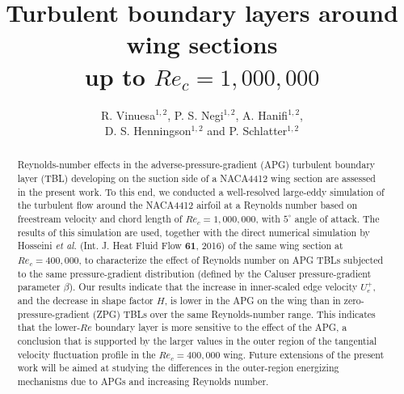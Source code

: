 \documentclass[preprint,12pt,authoryear]{elsarticle}
\begin{document}
\begin{frontmatter}



\title{Turbulent boundary layers around wing sections \\ up to $Re_{c}=1,000,000$}


\author{R. Vinuesa$^{1,2}$, P. S. Negi$^{1,2}$, A. Hanifi$^{1,2}$, \\ D. S. Henningson$^{1,2}$ and P. Schlatter$^{1,2}$}

\address{$^1$Linn\'e FLOW Centre, KTH Mechanics, SE-100 44 Stockholm, Sweden\\
$^2$Swedish e-Science Research Centre (SeRC), Stockholm, Sweden}

\begin{abstract}
Reynolds-number effects in the adverse-pressure-gradient (APG) turbulent boundary layer (TBL) developing on the suction side of a NACA4412 wing section are assessed in the present work. To this end, we conducted a well-resolved large-eddy simulation of the turbulent flow around the NACA4412 airfoil at a Reynolds number based on freestream velocity and chord length of $Re_{c}=1,000,000$, with $5^{\circ}$ angle of attack. The results of this simulation are used, together with the direct numerical simulation by Hosseini {\it et al.} (Int. J. Heat Fluid Flow {\bf 61}, 2016) of the same wing section at $Re_{c}=400,000$, to characterize the effect of Reynolds number on APG TBLs subjected to the same pressure-gradient distribution (defined by the Caluser pressure-gradient parameter $\beta$). Our results indicate that the increase in inner-scaled edge velocity $U^{+}_{e}$, and the decrease in shape factor $H$, is lower in the APG on the wing than in zero-pressure-gradient (ZPG) TBLs over the same Reynolds-number range. This indicates that the lower-$Re$ boundary layer is more sensitive to the effect of the APG, a conclusion that is supported by the larger values in the outer region of the tangential velocity fluctuation profile in the $Re_{c}=400,000$ wing. Future extensions of the present work will be aimed at studying the differences in the outer-region energizing mechanisms due to APGs and increasing Reynolds number.


\end{abstract}
\end{frontmatter}
\end{document}
